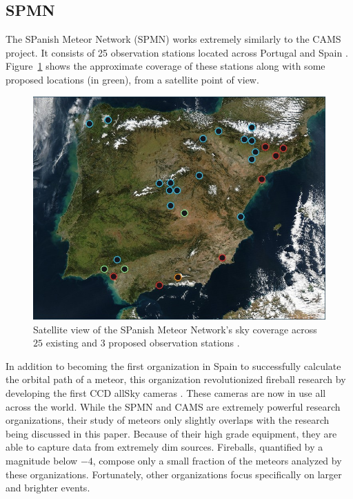 \subsection{SPMN}

The SPanish Meteor Network (SPMN) works extremely similarly to the CAMS project.  
It consists of 25 observation stations located across Portugal and Spain \cite{trigo-rodriguez_2006_2007}.
Figure~\ref{SPan} shows the approximate coverage of these stations along with some proposed locations (in green), from a satellite point of view.  

\begin{figure}[ht!]
  \centering
  \includegraphics[scale=0.3]{images/satalite_of_love.png}
  \caption{Satellite view of the SPanish Meteor Network's sky coverage across $25$ existing and $3$ proposed observation stations  \cite{noauthor_presentation_nodate}. }
  \label{SPan}
\end{figure}

In addition to becoming the first organization in Spain to successfully calculate the orbital path of a meteor, this organization revolutionized fireball research by developing the first CCD allSky cameras \cite{noauthor_presentation_nodate}.
These cameras are now in use all across the world.
While the SPMN and CAMS are extremely powerful research organizations, their study of meteors only slightly overlaps with the research being discussed in this paper.
Because of their high grade equipment, they are able to capture data from extremely dim sources.
Fireballs, quantified by a magnitude below $-4$, compose only a small fraction of the meteors analyzed by these organizations.
Fortunately, other organizations focus specifically on larger and brighter events.

